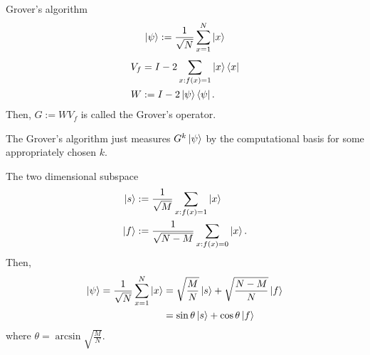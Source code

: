 \documentclass{beamer}
\newcommand\emm[1]{\textcolor{redorange}{{#1}}}
\begin{document}
\begin{frame}{Grover's algorithm}
\begin{align*}
\ket{\psi} := \frac1{\sqrt{N}} \sum_{x=1}^N \ket{x}
\end{align*}
\begin{align*}
V_f  &= I - 2 \sum_{x: f(x) = 1}\ket{x}\bra{x}\\
W    &:= I - 2 \ket{\psi}\bra{\psi}.
\end{align*}
Then, $G:=WV_f$ is called the Grover's operator.

\vspace{2em}
The Grover's algorithm just measures \emm{$G^k\ket{\psi}$} by the computational basis for some \emm{appropriately chosen} $k$.
\end{frame}



\begin{frame}{The two dimensional subspace}
\begin{align*}
\ket{s} &:= \frac1{\sqrt{M}}\sum_{x: f(x) = 1} \ket{x}\\
\ket{f} &:= \frac1{\sqrt{N-M}}\sum_{x: f(x) = 0} \ket{x}.
\end{align*}
Then,
\begin{align*}
\ket{\psi} = \frac1{\sqrt{N}} \sum_{x=1}^N \ket{x}
&= \sqrt{\frac{M}{N}} \ket{s} + \sqrt{\frac{N-M}{N}} \ket{f}\\
&= \sin\theta\ket{s} + \cos\theta\ket{f}
\end{align*}
where $\theta=\arcsin\sqrt{\frac{M}{N}}$.
\end{frame}
\end{document}
